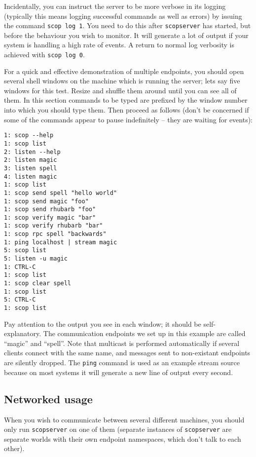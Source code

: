 \documentclass[12pt,a4paper,twoside]{article}
\renewcommand{\_}{\texttt{\symbol{95}}}
\begin{document}
Incidentally, you can instruct the server to be more verbose
in its logging (typically this means logging successful commands
as well as errors) by issuing the command \texttt{scop log 1}.
You need to do this after \texttt{scopserver} has started,
but before the behaviour you wish to monitor. It will generate a
lot of output if your system is handling a high rate of events.
A return to normal log verbosity is achieved with \texttt{scop log 0}.

For a quick and effective demonstration of multiple endpoints, you
should open several shell windows on the machine which is running the
server; lets say five windows for this test. Resize and shuffle them
around until you can see all of them. In this section commands to be
typed are prefixed by the window number into which you should type
them. Then proceed as follows (don't be concerned if some of the
commands appear to pause indefinitely -- they are waiting for events):

\begin{verbatim}
1: scop --help
1: scop list
2: listen --help
2: listen magic
3: listen spell
4: listen magic
1: scop list
1: scop send spell "hello world"
1: scop send magic "foo"
1: scop send rhubarb "foo"
1: scop verify magic "bar"
1: scop verify rhubarb "bar"
1: scop rpc spell "backwards"
1: ping localhost | stream magic
5: scop list
5: listen -u magic
1: CTRL-C
1: scop list
1: scop clear spell
1: scop list
5: CTRL-C
1: scop list
\end{verbatim}

Pay attention to the output you see in each window; it should be
self-explanatory. The communication endpoints we set up in this example
are called ``magic'' and ``spell''. Note that multicast is performed
automatically if several clients connect with the same name, and
messages sent to non-existant endpoints are silently dropped. The
\texttt{ping} command is used as an example stream source because on
most systems it will generate a new line of output every second.

\subsection{Networked usage}

When you wish to communicate between several different machines,
you should only run \texttt{scopserver} on one of them
(separate instances of \texttt{scopserver} are separate
worlds with their own endpoint namespaces, which don't talk
to each other).
\end{document}
